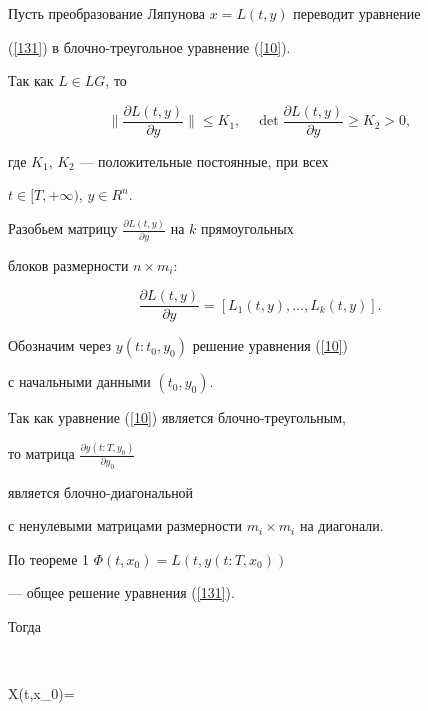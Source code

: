 \begin{pf}


Пусть преобразование Ляпунова $x=L(t,y)$ переводит уравнение


(\ref{131}) в блочно-треугольное уравнение (\ref{10}).


Так как $L\in LG$, то


\begin{equation}


\label{1382}


\bigg\|\frac{\partial L(t,y)}{\partial y}\bigg\|\leq K_{1}, \quad


\det\frac{\partial L(t,y)}{\partial y}\geq K_{2}>0,


\end{equation}


где $K_1$, $K_2$ --- положительные постоянные, при всех


$t\in [T,+\infty)$, $y\in R^n$.





Разобьем матрицу $\frac{\partial L(t,y)}{\partial y}$ на $k$ прямоугольных


блоков размерности $n\times m_{i}$:


$$


\frac{\partial L(t,y)}{\partial y}=[L_{1}(t,y),\dotsc,L_{k}(t,y)].


$$





Обозначим через $y(t:t_0,y_0)$ решение уравнения (\ref{10})


с начальными данными $(t_0,y_0)$.





Так как уравнение (\ref{10}) является блочно-треугольным,


то матрица $\frac{\partial y(t:T,y_0)}{\partial y_{0}}$


является блочно-диагональной


с ненулевыми матрицами размерности $m_{i}\times m_{i}$ на диагонали.





По теореме 1\; $\Phi(t,x_{0})=L(t,y(t:T,x_{0}))$


--- общее решение уравнения (\ref{131}).


Тогда


$$


X(t,x_{0})=



\end{pf}
